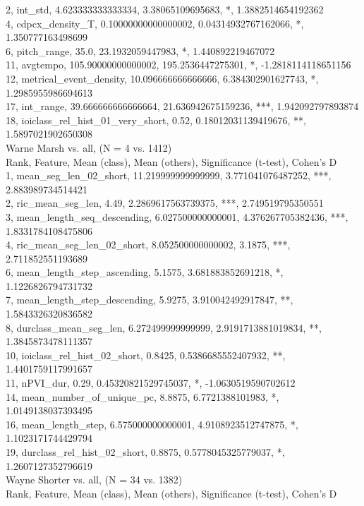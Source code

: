 2, int_std, 4.623333333333334, 3.38065109695683, *, 1.3882514654192362\\
4, cdpcx_density_T, 0.10000000000000002, 0.04314932767162066, *, 1.350777163498699\\
6, pitch_range, 35.0, 23.1932059447983, *, 1.440892219467072\\
11, avgtempo, 105.90000000000002, 195.2536447275301, *, -1.2818114118651156\\
12, metrical_event_density, 10.096666666666666, 6.384302901627743, *, 1.2985955986694613\\
17, int_range, 39.666666666666664, 21.636942675159236, ***, 1.942092797893874\\
18, ioiclass_rel_hist_01_very_short, 0.52, 0.18012031139419676, **, 1.5897021902650308\\
Warne Marsh vs. all, (N = 4 vs. 1412)\\
Rank, Feature, Mean (class), Mean (others), Significance (t-test), Cohen's D\\
1, mean_seg_len_02_short, 11.219999999999999, 3.771041076487252, ***, 2.883989734514421\\
2, ric_mean_seg_len, 4.49, 2.2869617563739375, ***, 2.749519795350551\\
3, mean_length_seq_descending, 6.027500000000001, 4.376267705382436, ***, 1.8331784108475806\\
4, ric_mean_seg_len_02_short, 8.052500000000002, 3.1875, ***, 2.711852551193689\\
6, mean_length_step_ascending, 5.1575, 3.681883852691218, *, 1.1226826794731732\\
7, mean_length_step_descending, 5.9275, 3.910042492917847, **, 1.5843326320836582\\
8, durclass_mean_seg_len, 6.272499999999999, 2.9191713881019834, **, 1.3845873478111357\\
10, ioiclass_rel_hist_02_short, 0.8425, 0.5386685552407932, **, 1.4401759117991657\\
11, nPVI_dur, 0.29, 0.45320821529745037, *, -1.0630519590702612\\
14, mean_number_of_unique_pc, 8.8875, 6.7721388101983, *, 1.0149138037393495\\
16, mean_length_step, 6.575000000000001, 4.9108923512747875, *, 1.1023171744429794\\
19, durclass_rel_hist_02_short, 0.8875, 0.5778045325779037, *, 1.2607127352796619\\
Wayne Shorter vs. all, (N = 34 vs. 1382)\\
Rank, Feature, Mean (class), Mean (others), Significance (t-test), Cohen's D\\
